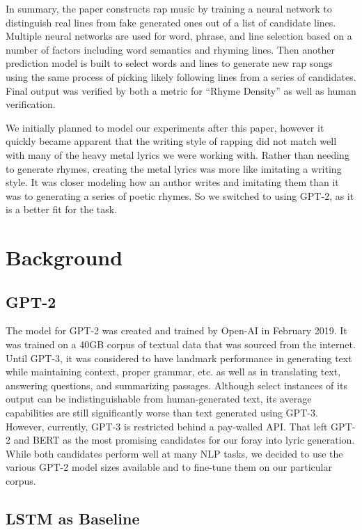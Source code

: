 \documentclass[11pt]{article}
\begin{document}
In summary, the paper constructs rap music by training a neural network to distinguish real lines from fake generated ones out of a list of candidate lines. Multiple neural networks are used for word, phrase, and line selection based on a number of factors including word semantics and rhyming lines. Then another prediction model is built to select words and lines to generate new rap songs using the same process of picking likely following lines from a series of candidates. Final output was verified by both a metric for “Rhyme Density” as well as human verification.

We initially planned to model our experiments after this paper, however it quickly became apparent that the writing style of rapping did not match well with many of the heavy metal lyrics we were working with. Rather than needing to generate rhymes, creating the metal lyrics was more like imitating a writing style. It was closer modeling how an author writes and imitating them than it was to generating a series of poetic rhymes. So we switched to using GPT-2, as it is a better fit for the task.

\section{Background}

\subsection{GPT-2}

The model for GPT-2 was created and trained by Open-AI in February 2019. It was trained on a 40GB corpus of textual data that was sourced from the internet. Until GPT-3, it was considered to have landmark performance in generating text while maintaining context, proper grammar, etc. as well as in translating text, answering questions, and summarizing passages. Although select instances of its output can be indistinguishable from human-generated text, its average capabilities are still significantly worse than text generated using GPT-3. However, currently, GPT-3 is restricted behind a pay-walled API. That left GPT-2 and BERT as the most promising candidates for our foray into lyric generation. While both candidates perform well at many NLP tasks, we decided to use the various GPT-2 model sizes available and to fine-tune them on our particular corpus.

\subsection{LSTM as Baseline}
\end{document}

